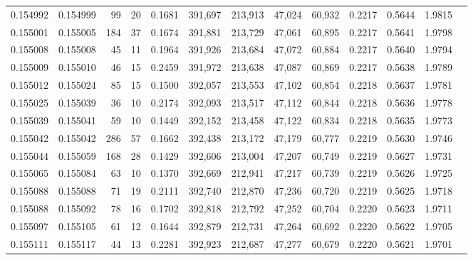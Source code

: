 \begin{tabular}{rrrrrrrrrrrrr}
0.154992 & 0.154999 &    99 &  20 &                                     0.1681 & 391,697 & 213,913 &  47,024 &  60,932 & 0.2217 & 0.5644 & 1.9815 \\
0.155001 & 0.155005 &   184 &  37 &                                     0.1674 & 391,881 & 213,729 &  47,061 &  60,895 & 0.2217 & 0.5641 & 1.9798 \\
0.155008 & 0.155008 &    45 &  11 &                                     0.1964 & 391,926 & 213,684 &  47,072 &  60,884 & 0.2217 & 0.5640 & 1.9794 \\
0.155009 & 0.155010 &    46 &  15 &                                     0.2459 & 391,972 & 213,638 &  47,087 &  60,869 & 0.2217 & 0.5638 & 1.9789 \\
0.155012 & 0.155024 &    85 &  15 &                                     0.1500 & 392,057 & 213,553 &  47,102 &  60,854 & 0.2218 & 0.5637 & 1.9781 \\
0.155025 & 0.155039 &    36 &  10 &                                     0.2174 & 392,093 & 213,517 &  47,112 &  60,844 & 0.2218 & 0.5636 & 1.9778 \\
0.155039 & 0.155041 &    59 &  10 &                                     0.1449 & 392,152 & 213,458 &  47,122 &  60,834 & 0.2218 & 0.5635 & 1.9773 \\
0.155042 & 0.155042 &   286 &  57 &                                     0.1662 & 392,438 & 213,172 &  47,179 &  60,777 & 0.2219 & 0.5630 & 1.9746 \\
0.155044 & 0.155059 &   168 &  28 &                                     0.1429 & 392,606 & 213,004 &  47,207 &  60,749 & 0.2219 & 0.5627 & 1.9731 \\
0.155065 & 0.155084 &    63 &  10 &                                     0.1370 & 392,669 & 212,941 &  47,217 &  60,739 & 0.2219 & 0.5626 & 1.9725 \\
0.155088 & 0.155088 &    71 &  19 &                                     0.2111 & 392,740 & 212,870 &  47,236 &  60,720 & 0.2219 & 0.5625 & 1.9718 \\
0.155088 & 0.155092 &    78 &  16 &                                     0.1702 & 392,818 & 212,792 &  47,252 &  60,704 & 0.2220 & 0.5623 & 1.9711 \\
0.155097 & 0.155105 &    61 &  12 &                                     0.1644 & 392,879 & 212,731 &  47,264 &  60,692 & 0.2220 & 0.5622 & 1.9705 \\
0.155111 & 0.155117 &    44 &  13 &                                     0.2281 & 392,923 & 212,687 &  47,277 &  60,679 & 0.2220 & 0.5621 & 1.9701 \\

\end{tabular}
